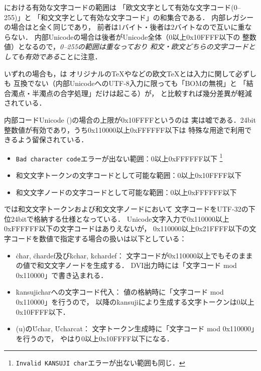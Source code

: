 \documentclass[a4paper,11pt,nomag,dvipdfmx]{jsarticle}
\begin{document}
\upTeX における有効な文字コードの範囲は
「欧文文字として有効な文字コード(0--255)」と
「和文文字として有効な文字コード」の和集合である．
内部レガシーの場合は\pTeX と全く同じであり，
前者は1バイト・後者は2バイトなので互いに重ならない．
内部Unicodeの場合は後者がUnicode全体（0以上0x10FFFF以下の
整数値）となるので，\emph{0--255の範囲は重なっており
和文・欧文どちらの文字コードとしても有効である}ことに注意．

いずれの場合も，\upTeX は
オリジナルの\TeX や\pdfTeX などの欧文\TeX とは入力に関して必ずしも
互換でない（内部UnicodeへのUTF-8入力に限っても「BOMの無視」と
「結合濁点・半濁点の合字処理」だけは起こる）が，
\pTeX と比較すれば幾分差異が軽減されている．

\begin{dangerous}
  内部コードUnicode ()の場合の上限が0x10FFFFというのは
  実は嘘である．24bit整数値が有効であり，うち0x110000以上0xFFFFFF以下は
  特殊な用途で利用できるよう留保されている．
  \begin{itemize}
   \item \verb|Bad character code|エラーが出ない範囲：0以上0xFFFFFF以下
    \footnote{\verb|Invalid KANSUJI char|エラーが出ない範囲も同じ．}
   \item 和文文字トークンの文字コードとして可能な範囲：0以上0x10FFFF以下
   \item 和文文字ノードの文字コードとして可能な範囲：0以上0xFFFFFF以下
  \end{itemize}
  \upTeX では和文文字トークンおよび和文文字ノードにおいて
  文字コードをUTF-32の下位24bitで格納する仕様となっている．
  Unicode文字入力で0x110000以上0xFFFFFF以下の文字コードはありえないが，
  0x110000以上0x21FFFF以下の文字コードを数値で指定する場合の扱いは以下としている：
  \begin{itemize}
   \item \.{char}, \.{chardef}及び\.{kchar}, \.{kchardef}：
    文字コードが0x110000以上でもそのままの値で和文文字ノードを生成する．
    DVI出力時には「文字コード mod 0x110000」で書き込まれる．
   \item \.{kansujichar}への文字コード代入：
    値の格納時に「文字コード mod 0x110000」を行うので，
    以降の\.{kansuji}により生成する文字トークンは0以上0x10FFFF以下．
   \item \eTeXpre(u)\pTeX の\.{Uchar}, \.{Ucharcat}：
    文字トークン生成時に「文字コード mod 0x110000」を行うので，
    やはり0以上0x10FFFF以下になる．

\end{itemize}
\end{dangerous}
\end{document}
